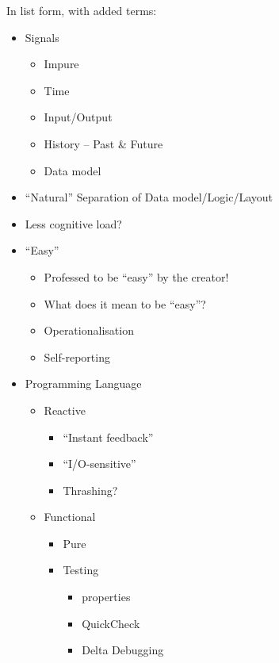 \documentclass[11pt,openright,a4paper]{report}
\begin{document}


In list form, with added terms:

\begin{itemize}
	\item Signals
	\begin{itemize}
		\item Impure
		\item Time
		\item Input/Output
		\item History -- Past \& Future
		\item Data model
	\end{itemize}
	\item ``Natural'' Separation of Data model/Logic/Layout
	\item Less cognitive load?
	\item ``Easy''
	\begin{itemize}
		\item Professed to be ``easy'' by the creator!
		\item What does it mean to be ``easy''?
		\item Operationalisation
		\item Self-reporting
	\end{itemize}
	\item Programming Language
	\begin{itemize}
		\item Reactive
		\begin{itemize}
			\item ``Instant feedback''
			\item ``I/O-sensitive''
			\item Thrashing?
		\end{itemize}
		\item Functional
		\begin{itemize}
			\item Pure
			\item Testing
			\begin{itemize}
				\item properties
				\item QuickCheck
				\item Delta Debugging
			\end{itemize}
		\end{itemize}

\end{itemize}
\end{itemize}
\end{document}
